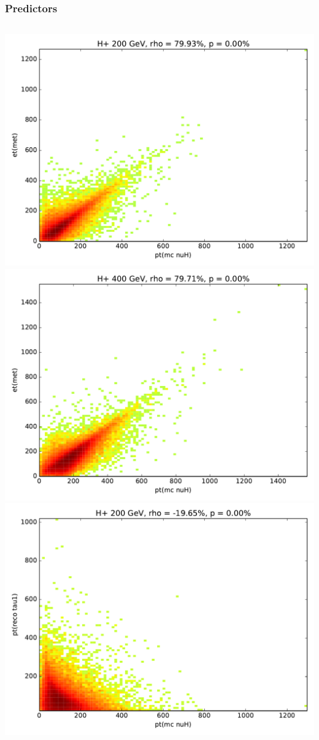 \documentclass[9pt, lualatex]{beamer}
\begin{document}
\begin{frame}
    \frametitle{Predictors}
    \begin{columns}
        \centering
        \includegraphics[width=\textwidth]{correlations/hp200_et_met.pdf}\\
        \includegraphics[width=\textwidth]{correlations/hp400_et_met.pdf}
        \centering
        \includegraphics[width=\textwidth]{correlations/hp200_pt_reco_tau1.pdf}\\

\end{columns}
\end{frame}
\end{document}
